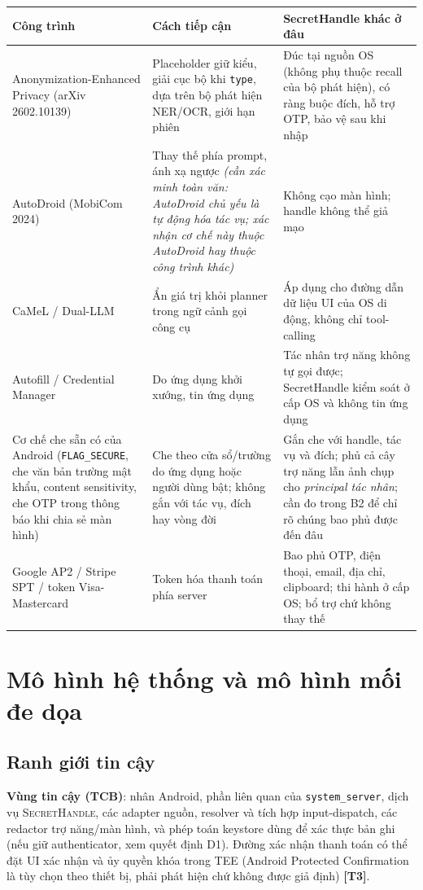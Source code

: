 \documentclass[11pt,a4paper]{article}
\newcommand{\code}[1]{\texttt{\small #1}}
\newcommand{\term}[1]{\textbf{#1}}
\newcommand{\SH}{\textsc{SecretHandle}}
\newcommand{\Tthree}{\textbf{\color{shgray}[T3]}}
\begin{document}
\begin{longtable}{@{}p{3.4cm}p{5.2cm}p{6.4cm}@{}}
\toprule
\textbf{Công trình} & \textbf{Cách tiếp cận} & \textbf{SecretHandle khác ở đâu} \\
\midrule
\endhead
Anonymization-Enhanced Privacy (arXiv 2602.10139) & Placeholder giữ kiểu, giải cục bộ khi \code{type}, dựa trên
bộ phát hiện NER/OCR, giới hạn phiên & Đúc tại nguồn OS (không phụ thuộc recall của bộ phát hiện), có ràng buộc
đích, hỗ trợ OTP, bảo vệ sau khi nhập \\
AutoDroid (MobiCom 2024) & Thay thế phía prompt, ánh xạ ngược \emph{(cần xác minh toàn văn: AutoDroid chủ yếu là
tự động hóa tác vụ; xác nhận cơ chế này thuộc AutoDroid hay thuộc công trình khác)} & Không cạo màn hình; handle không thể giả mạo \\
CaMeL / Dual-LLM & Ẩn giá trị khỏi planner trong ngữ cảnh gọi công cụ & Áp dụng cho đường dẫn dữ liệu UI của OS
di động, không chỉ tool-calling \\
Autofill / Credential Manager & Do ứng dụng khởi xướng, tin ứng dụng & Tác nhân trợ năng không tự gọi được;
SecretHandle kiểm soát ở cấp OS và không tin ứng dụng \\
Cơ chế che sẵn có của Android (\code{FLAG\_SECURE}, che văn bản trường mật khẩu, content sensitivity, che OTP trong thông báo khi chia sẻ màn hình) &
Che theo cửa sổ/trường do ứng dụng hoặc người dùng bật; không gắn với tác vụ, đích hay vòng đời & Gắn che với handle, tác vụ và đích; phủ cả cây
trợ năng lẫn ảnh chụp cho \emph{principal tác nhân}; cần đo trong B2 để chỉ rõ chúng bao phủ được đến đâu \\
Google AP2 / Stripe SPT / token Visa-Mastercard & Token hóa thanh toán phía server & Bao phủ OTP, điện thoại,
email, địa chỉ, clipboard; thi hành ở cấp OS; bổ trợ chứ không thay thế \\
\bottomrule
\end{longtable}

\section{Mô hình hệ thống và mô hình mối đe dọa}

\subsection{Ranh giới tin cậy}

\term{Vùng tin cậy (TCB)}: nhân Android, phần liên quan của \code{system\_server}, dịch vụ \SH{},
các adapter nguồn, resolver và tích hợp input-dispatch, các redactor trợ năng/màn hình, và phép toán keystore
dùng để xác thực bản ghi (nếu giữ authenticator, xem quyết định D1). Đường xác nhận thanh toán có thể đặt UI xác nhận
và ủy quyền khóa trong TEE (Android Protected Confirmation là tùy chọn theo thiết bị, phải phát hiện chứ không được giả định) \Tthree.
\end{document}
